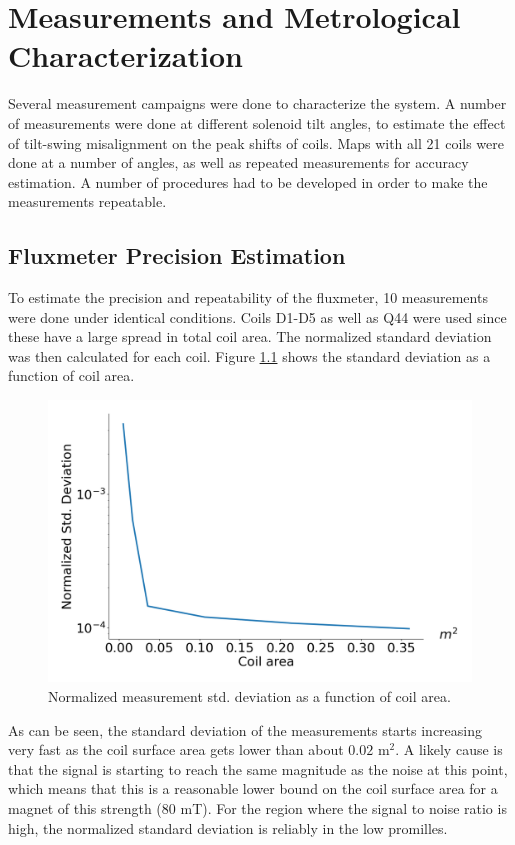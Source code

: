 \chapter{Measurements and Metrological Characterization}
Several measurement campaigns were done to characterize the system.
A number of measurements were done at different solenoid tilt
angles, to estimate the effect of tilt-swing misalignment on
the peak shifts of coils. Maps with all 21 coils
were done at a number of angles, as well as repeated measurements
for accuracy estimation. A number of procedures had to be developed
in order to make the measurements repeatable.

\section{Fluxmeter Precision Estimation}
To estimate the precision and repeatability of the fluxmeter, 10
measurements were done under identical conditions. Coils D1-D5 as
well as Q44 were used since these have a large spread in total coil area.
The normalized standard deviation was then calculated for each coil.
Figure \ref{fig:coilarea} shows the standard deviation as a function
of coil area.

\begin{figure}[!h]
    \centering
    \includegraphics[width=0.8\linewidth]{figs/coilarea-error}
    \caption{Normalized measurement std. deviation as a function of
        coil area.}
    \label{fig:coilarea}
\end{figure}

As can be seen, the standard deviation of the measurements starts
increasing very fast as the coil surface area gets lower than
about $0.02$ $\text{m}^2$. A likely cause is that the signal
is starting to reach the same magnitude as the noise at this
point, which means that this is a reasonable lower bound
on the coil surface area for a magnet of this strength ($80$ mT).
For the region where the signal to noise ratio is high, the
normalized standard deviation is reliably in the low promilles.

